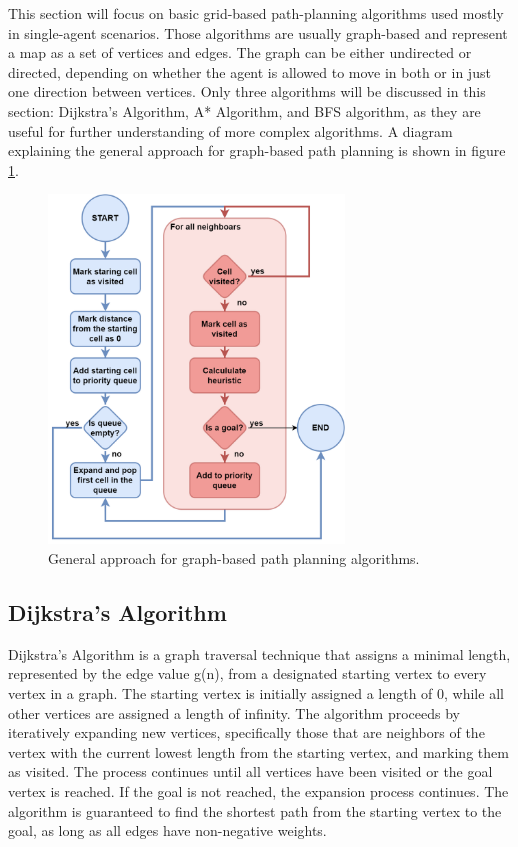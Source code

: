
This section will focus on basic grid-based path-planning algorithms used mostly in single-agent scenarios. Those algorithms are usually graph-based and represent a map as a set of vertices and edges. The graph can be either undirected or directed, depending on whether the agent is allowed to move in both or in just one direction between vertices\cite{basic_algorithms}. Only three algorithms will be discussed in this section: Dijkstra's Algorithm, A* Algorithm, and BFS algorithm, as they are useful for further understanding of more complex algorithms. A diagram explaining the general approach for graph-based path planning is shown in figure \ref{fig:simple_path_planning}. 

\begin{figure}[H]
    \centering
    \includegraphics[width=0.7\textwidth]{pictures/simple_algos.png}
    \caption{General approach for graph-based path planning algorithms. }
    \label{fig:simple_path_planning}
\end{figure}


\subsection{Dijkstra's Algorithm}
Dijkstra's Algorithm is a graph traversal technique that assigns a minimal length, represented by the edge value g(n), from a designated starting vertex to every vertex in a graph. The starting vertex is initially assigned a length of 0, while all other vertices are assigned a length of infinity. The algorithm proceeds by iteratively expanding new vertices, specifically those that are neighbors of the vertex with the current lowest length from the starting vertex, and marking them as visited. The process continues until all vertices have been visited or the goal vertex is reached. If the goal is not reached, the expansion process continues. The algorithm is guaranteed to find the shortest path from the starting vertex to the goal, as long as all edges have non-negative weights. \cite{basic_algorithms, basic_2}

